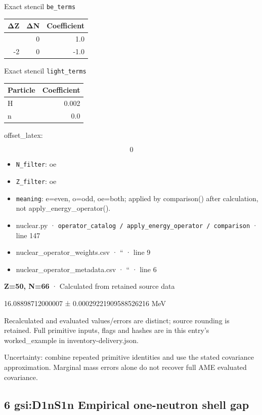 \documentclass[
  11pt,
  letterpaper,
]{article}
\begin{document}
Exact stencil \texttt{be\_terms}

\begin{longtable}[]{@{}rrr@{}}
\toprule\noalign{}
ΔZ & ΔN & Coefficient \\
\midrule\noalign{}
\endhead
\bottomrule\noalign{}
\endlastfoot
0 & 0 & 1.0 \\
-2 & 0 & -1.0 \\
\end{longtable}

Exact stencil \texttt{light\_terms}

\begin{longtable}[]{@{}lr@{}}
\toprule\noalign{}
Particle & Coefficient \\
\midrule\noalign{}
\endhead
\bottomrule\noalign{}
\endlastfoot
H & 0.002 \\
n & 0.0 \\
\end{longtable}

offset\_latex:

\[
0
\]

\begin{itemize}
\item
  \texttt{N\_filter}: oe
\item
  \texttt{Z\_filter}: oe
\item
  \texttt{meaning}: e=even, o=odd, oe=both; applied by comparison()
  after calculation, not apply\_energy\_operator().
\item
  nuclear.py ·
  \texttt{operator\_catalog\ /\ apply\_energy\_operator\ /\ comparison}
  · line 147
\item
  nuclear\_operator\_weights.csv · `` · line 9
\item
  nuclear\_operator\_metadata.csv · `` · line 6
\end{itemize}

\textbf{Z=50, N=66} · Calculated from retained source data

16.08898712000007 ± 0.00029221909588526216 MeV

Recalculated and evaluated values/errors are distinct; source rounding
is retained. Full primitive inputs, flags and hashes are in this entry's
worked\_example in inventory-delivery.json.

Uncertainty: combine repeated primitive identities and use the stated
covariance approximation. Marginal mass errors alone do not recover full
AME evaluated covariance.

\subsection{6 gsi:D1nS1n Empirical one-neutron shell
gap}\label{gsid1ns1n-empirical-one-neutron-shell-gap}
\end{document}
